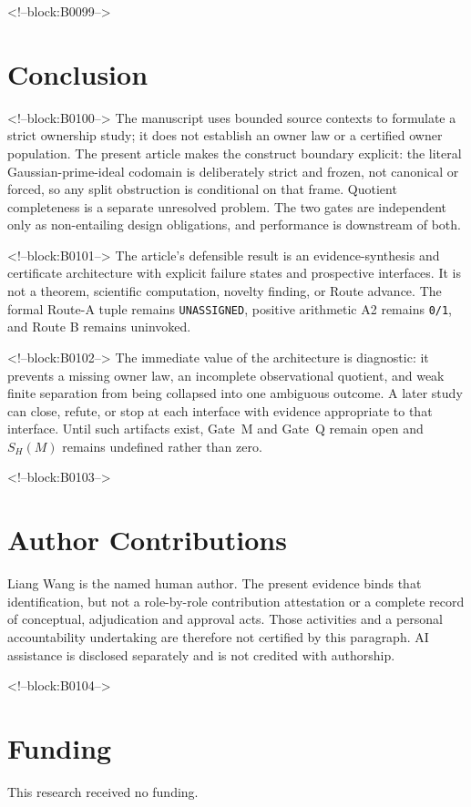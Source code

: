 \documentclass[11pt,a4paper]{article}
\begin{document}
<!--block:B0099-->
\section{Conclusion}

<!--block:B0100-->
The manuscript uses bounded source contexts to formulate a strict ownership study; it does not establish an owner law or a certified owner population. The present article makes the construct boundary explicit: the literal Gaussian-prime-ideal codomain is deliberately strict and frozen, not canonical or forced, so any split obstruction is conditional on that frame. Quotient completeness is a separate unresolved problem. The two gates are independent only as non-entailing design obligations, and performance is downstream of both.

<!--block:B0101-->
The article's defensible result is an evidence-synthesis and certificate architecture with explicit failure states and prospective interfaces. It is not a theorem, scientific computation, novelty finding, or Route advance. The formal Route-A tuple remains \texttt{UNASSIGNED}, positive arithmetic A2 remains \texttt{0/1}, and Route B remains uninvoked.

<!--block:B0102-->
The immediate value of the architecture is diagnostic: it prevents a missing owner law, an incomplete observational quotient, and weak finite separation from being collapsed into one ambiguous outcome. A later study can close, refute, or stop at each interface with evidence appropriate to that interface. Until such artifacts exist, Gate~M and Gate~Q remain open and \(S_H(M)\) remains undefined rather than zero.

<!--block:B0103-->
\section*{Author Contributions}
Liang Wang is the named human author. The present evidence binds that identification, but not a role-by-role contribution attestation or a complete record of conceptual, adjudication and approval acts. Those activities and a personal accountability undertaking are therefore not certified by this paragraph. AI assistance is disclosed separately and is not credited with authorship.

<!--block:B0104-->
\section*{Funding}
This research received no funding.
\end{document}
